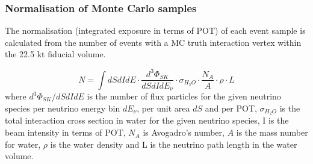 \subsubsection {Normalisation of Monte Carlo samples}
\label{sec:mc_templates:normalization}


The normalisation (integrated exposure in terms of POT) of each event sample is calculated from
the number of events with a MC truth interaction vertex within the 22.5 kt fiducial volume.

\begin{equation}
\displaystyle
  N = \int  dS dI dE \cdot
            \frac{d^{3}\Phi_{SK}}{dS dI dE_{\nu}} \cdot
            \sigma_{H_{2}O} \cdot
            \frac{N_{A}}{A} \cdot \rho \cdot L 
\end{equation}
where 
$d^{3}\Phi_{SK}$/$dS dI dE$ is the number of flux particles for the given neutrino species 
per neutrino energy bin $dE_{\nu}$, per unit area $dS$ and per POT,
$\sigma_{H_{2}O}$ is the total interaction cross section in water
for the given neutrino species,
I is the beam intensity in terms of POT,
$N_{A}$ is  Avogadro's number,
$A$ is the mass number for water,
$\rho$ is the water density
and L is the neutrino path length in the water volume.

